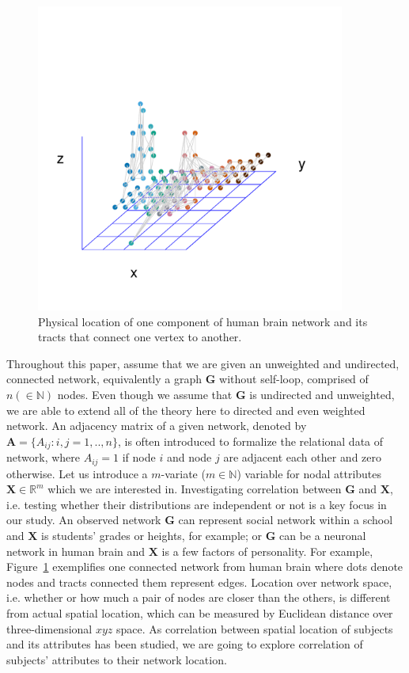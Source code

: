 \documentclass[12pt]{article}
\theoremstyle{definition}
\begin{document}
\begin{figure}[h]
	\centering
	\includegraphics[width=4in]{../Figure/intro.pdf}	
	\caption{Physical location of one component of human brain network and its tracts that connect one vertex to another.}
	\label{fig:intro}
\end{figure}

Throughout this paper, assume that we are given an unweighted and undirected, connected network, equivalently a graph $\mathbf{G}$ without self-loop, comprised of$n (\in \mathbb{N})$ nodes. Even though we assume that $\mathbf{G}$ is undirected and unweighted, we are able to extend all of the theory here to directed and even weighted network. An adjacency matrix of a given network, denoted by $\mathbf{A} = \{A_{ij} : i,j= 1,..,n \}$, is often introduced to formalize the relational data of network, where $A_{ij} = 1$ if node $i$ and node $j$ are adjacent each other and zero otherwise. Let us introduce a $m$-variate ($m \in \mathbb{N}$) variable for nodal attributes $\mathbf{X}  \in \mathbb{R}^{m}$ which we are interested in. Investigating correlation between $\mathbf{G}$ and $\mathbf{X}$, i.e. testing whether their distributions are independent or not is a key focus in our study. An observed network $\mathbf{G}$ can represent social network within a school and $\mathbf{X}$ is students' grades or heights, for example; or $\mathbf{G}$ can be a neuronal network in human brain and $\mathbf{X}$ is a few factors of personality. For example, Figure~\ref{fig:intro} exemplifies one connected network from human brain where dots denote nodes and tracts connected them represent edges. Location over network space, i.e. whether or how much a pair of nodes are closer than the others, is different from actual spatial location, which can be measured by Euclidean distance over three-dimensional $xyz$ space. As correlation between spatial location of subjects and its attributes has been studied, we are going to explore correlation of subjects' attributes to their network location. 
	
\end{document}
